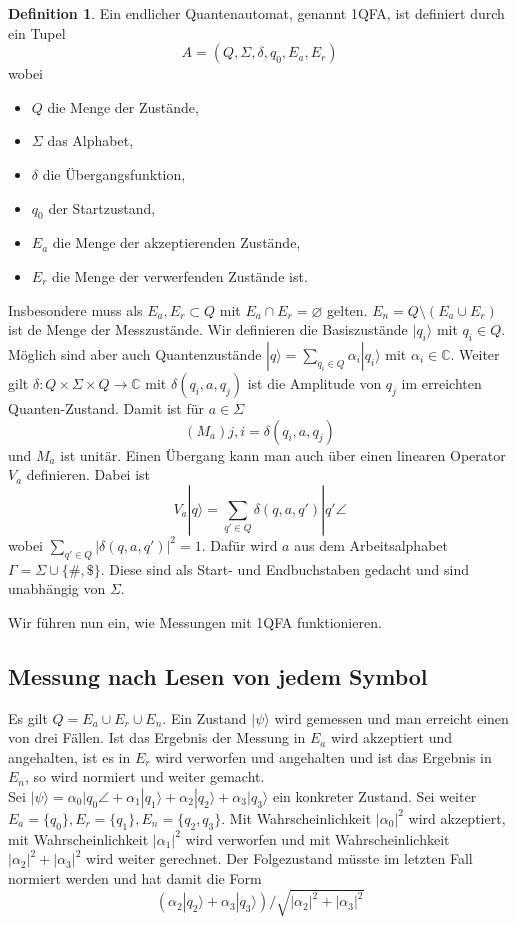 \documentclass[a4paper, 12pt]{article}
\theoremstyle{plain}
\theoremstyle{definition}
\newtheorem{definition}[theorem]{Definition} %
\theoremstyle{lemma}
\theoremstyle{remark}
\theoremstyle{example}
\begin{document}
	\begin{definition}
		Ein endlicher Quantenautomat, genannt 1QFA, ist definiert durch ein Tupel \[A = (Q,\Sigma,\delta,q_0,E_a,E_r)\] wobei \begin{itemize}
			\item $Q$ die Menge der Zustände,
			\item $\Sigma$ das Alphabet,
			\item $\delta$ die Übergangsfunktion,
			\item $q_0$ der Startzustand,
			\item $E_a$ die Menge der akzeptierenden Zustände,
			\item $E_r$ die Menge der verwerfenden Zustände ist.
		\end{itemize}
		Insbesondere muss als $E_a,E_r \subset Q$ mit $E_a \cap E_r = \varnothing$ gelten. $E_n = Q\setminus (E_a \cup E_r)$ ist de Menge der Messzustände. Wir definieren die Basiszustände $|q_i\rangle$ mit $q_i \in Q$. Möglich sind aber auch Quantenzustände $|q\rangle = \sum_{q_i \in Q} \alpha_i |q_i\rangle$ mit $\alpha_i \in \mathbb{C}$.  
		Weiter gilt $\delta: Q\times \Sigma \times Q \to \mathbb{C}$ mit $\delta(q_i,a,q_j)$ ist die Amplitude von $q_j$ im erreichten Quanten-Zustand. Damit ist für $a \in \Sigma$ \[(M_a){j,i} = \delta(q_i,a,q_j)\] und $M_a$ ist unitär. Einen Übergang kann man auch über einen linearen Operator $V_a$ definieren. Dabei ist \[V_a|q\rangle= \sum_{q' \in Q} \delta(q,a,q')|q'\angle\] wobei $\sum_{q' \in Q} \left|\delta(q,a,q')\right|^2 = 1$. Dafür wird $a$ aus dem Arbeitsalphabet $\Gamma = \Sigma \cup \{\#, \$\}$. Diese sind als Start- und Endbuchstaben gedacht und sind unabhängig von $\Sigma$.
	\end{definition}
	Wir führen nun ein, wie Messungen mit 1QFA funktionieren.
	\subsection{Messung nach Lesen von jedem Symbol}
	Es gilt $Q = E_a \cup E_r \cup E_n$. Ein Zustand $|\psi\rangle$ wird gemessen und man erreicht einen von drei Fällen. Ist das Ergebnis der Messung in $E_a$ wird akzeptiert und angehalten, ist es in $E_r$ wird verworfen und angehalten und ist das Ergebnis in $E_n$, so wird normiert und weiter gemacht.\\
	Sei $|\psi\rangle = \alpha_0 |q_0\angle + \alpha_1|q_1\rangle + \alpha_2|q_2\rangle + \alpha_3|q_3\rangle$ ein konkreter Zustand. Sei weiter $E_a = \{q_0\}, E_r = \{q_1\}, E_n = \{q_2,q_3\}$. Mit Wahrscheinlichkeit $\left|\alpha_0\right|^2$ wird akzeptiert, mit Wahrscheinlichkeit $\left|\alpha_1\right|^2$ wird verworfen und mit Wahrscheinlichkeit $\left|\alpha_2\right|^2 + \left|\alpha_3\right|^2$ wird weiter gerechnet. Der Folgezustand müsste im letzten Fall normiert werden und hat damit die Form \[(\alpha_2|q_2\rangle + \alpha_3|q_3\rangle)/\sqrt{\left|\alpha_2\right|^2 + \left|\alpha_3\right|^2}\]
\end{document}
